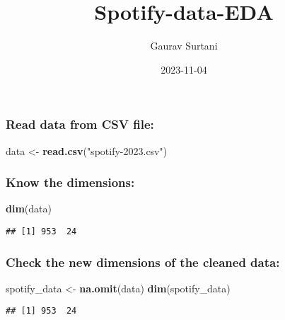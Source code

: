 \documentclass[
]{article}
\title{Spotify-data-EDA}
\author{Gaurav Surtani}
\date{2023-11-04}
\newenvironment{Shaded}{\begin{snugshade}}{\end{snugshade}}
\newcommand{\FunctionTok}[1]{\textcolor[rgb]{0.13,0.29,0.53}{\textbf{#1}}}
\newcommand{\NormalTok}[1]{#1}
\newcommand{\OtherTok}[1]{\textcolor[rgb]{0.56,0.35,0.01}{#1}}
\newcommand{\StringTok}[1]{\textcolor[rgb]{0.31,0.60,0.02}{#1}}
\begin{document}
\maketitle

\hypertarget{read-data-from-csv-file}{%
\subsubsection{Read data from CSV file:}\label{read-data-from-csv-file}}

\begin{Shaded}
\begin{Highlighting}[]
\NormalTok{data }\OtherTok{\textless{}{-}} \FunctionTok{read.csv}\NormalTok{(}\StringTok{"spotify{-}2023.csv"}\NormalTok{)}
\end{Highlighting}
\end{Shaded}

\hypertarget{know-the-dimensions}{%
\subsubsection{Know the dimensions:}\label{know-the-dimensions}}

\begin{Shaded}
\begin{Highlighting}[]
\FunctionTok{dim}\NormalTok{(data)}
\end{Highlighting}
\end{Shaded}

\begin{verbatim}
## [1] 953  24
\end{verbatim}

\hypertarget{check-the-new-dimensions-of-the-cleaned-data}{%
\subsubsection{Check the new dimensions of the cleaned
data:}\label{check-the-new-dimensions-of-the-cleaned-data}}

\begin{Shaded}
\begin{Highlighting}[]
\NormalTok{spotify\_data }\OtherTok{\textless{}{-}} \FunctionTok{na.omit}\NormalTok{(data)}
\FunctionTok{dim}\NormalTok{(spotify\_data)}
\end{Highlighting}
\end{Shaded}

\begin{verbatim}
## [1] 953  24
\end{verbatim}
\end{document}
